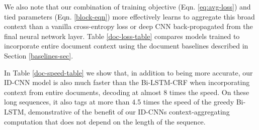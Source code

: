 \documentclass[11pt,letterpaper]{article}
\begin{document}
We also note that our combination of training objective (Eqn. \ref{eq:avg-loss}) and tied parameters (Eqn. \ref{block-eqn}) more effectively learns to aggregate this broad context than a vanilla cross-entropy loss or deep CNN back-propagated from the final neural network layer. Table \ref{doc-loss-table} compares models trained to incorporate entire document context using the document baselines described in Section \ref{baselines-sec}.

\begin{table}
\begin{center}
\end{center}
  \caption{Comparing ID-CNNs with 1) back-propagating loss only from the final layer ({\bf 1-loss}) and 2) untied parameters across blocks ({\bf noshare})}
  \label{doc-loss-table}
\end{table}

In Table \ref{doc-speed-table} we show that, in addition to being more accurate, our ID-CNN model is also much faster than the Bi-LSTM-CRF when incorporating context from entire documents, decoding at almost 8 times the speed. On these long sequences, it also tags at more than 4.5 times the speed of the greedy Bi-LSTM, demonstrative of the benefit of our ID-CNNs context-aggregating computation that does not depend on the length of the sequence.



\begin{table}
\begin{center}
    \end{center}
  \caption{Relative test-time speed of document models (fastest batch size for each model).}
  \label{doc-speed-table}
\end{table}
\end{document}
